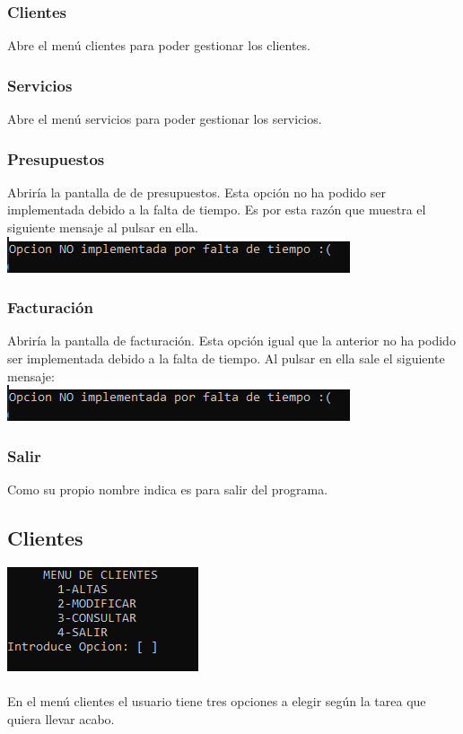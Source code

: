 \documentclass[12pt]{article}
\begin{document}
\subsubsection{Clientes}
Abre el menú clientes para poder gestionar los clientes.
\subsubsection{Servicios}
Abre el menú servicios para poder gestionar los servicios.
\subsubsection{Presupuestos}
Abriría la pantalla de de presupuestos. Esta opción no ha podido ser implementada debido a la falta de tiempo. Es por esta razón que muestra el siguiente mensaje al pulsar en ella.\\
\includegraphics[]{OpcionNoImplementada.PNG} 
\subsubsection{Facturación}
Abriría la pantalla de facturación. Esta opción igual que la anterior no ha podido ser implementada debido a la falta de tiempo. Al pulsar en ella sale el siguiente mensaje:\\ 
\includegraphics[]{OpcionNoImplementada.PNG}
\subsubsection{Salir}
Como su propio nombre indica es para salir del programa.

\subsection{Clientes}
\includegraphics[]{MenuClientes.PNG}\\\\
En el menú clientes el usuario tiene tres opciones a elegir según la tarea que quiera llevar acabo.
\end{document}
